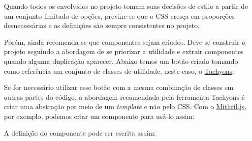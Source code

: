 Quando todos os envolvidos no projeto tomam suas decisões de estilo a
partir de um conjunto limitado de opções, previne-se que o CSS cresça em
proporções desnecessárias e as definições são sempre consistentes no
projeto.

Porém, ainda recomenda-se que componentes sejam criados. Deve-se
construir o projeto seguindo a abordagem de se priorizar a utilidade e
extrair componentes quando alguma duplicação aparecer. Abaixo temos um
botão criado tomando como referência um conjunto de classes de
utilidade, neste caso, o \href{http://tachyons.io/}{Tachyons}:

\begin{Shaded}
\begin{Highlighting}[]
\KeywordTok{>} 
\end{Highlighting}
\end{Shaded}

Se for necessário utilizar esse botão com a mesma combinação de classes
em outras partes do código, a abordagem recomendada pela ferramenta
Tachyons é criar uma abstração por meio de um \emph{template} e não pelo
CSS. Com o \href{https://mithril.js.org/}{Mithril.js}, por exemplo,
podemos criar um componente para usá-lo assim:

\begin{Shaded}
\begin{Highlighting}[]
\OperatorTok{,} \NormalTok{)}
\end{Highlighting}
\end{Shaded}

A definição do componente pode ser escrita assim:

